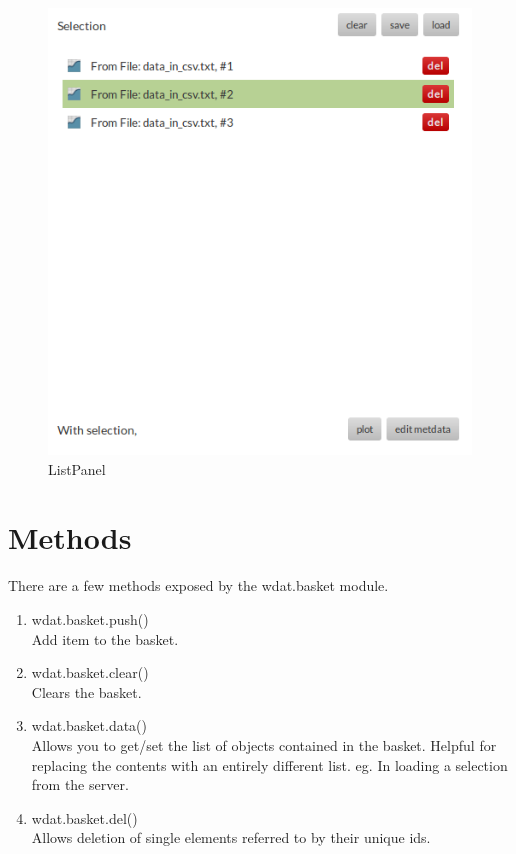 \begin{figure}[h!t]
  \centering
  \includegraphics[width=\textwidth]{src/images/wdat-basket.png}
  \caption{ListPanel}
\end{figure}

\section{Methods}

There are a few methods exposed by the wdat.basket module.

\begin{enumerate}
  \item{wdat.basket.push()} \hfill \\
  Add item to the basket.

  \item{wdat.basket.clear()} \hfill \\
  Clears the basket.

  \item{wdat.basket.data()} \hfill \\
  Allows you to get/set the list of objects contained in the basket.
  Helpful for replacing the contents with an entirely different list.
  eg. In loading a selection from the server.

  \item{wdat.basket.del()} \hfill \\
  Allows deletion of single elements referred to by their unique ids.
\end{enumerate}
